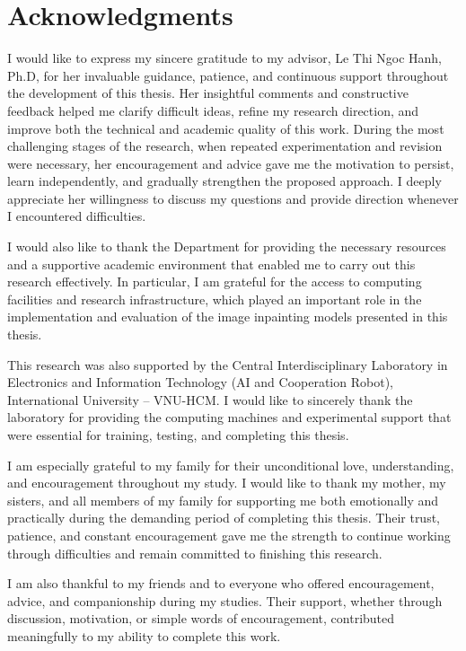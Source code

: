\documentclass[12pt, twoside]{report}
\begin{document}
\chapter*{Acknowledgments}
I would like to express my sincere gratitude to my advisor, Le Thi Ngoc Hanh, Ph.D, for her invaluable guidance, patience, and continuous support throughout the development of this thesis. Her insightful comments and constructive feedback helped me clarify difficult ideas, refine my research direction, and improve both the technical and academic quality of this work. During the most challenging stages of the research, when repeated experimentation and revision were necessary, her encouragement and advice gave me the motivation to persist, learn independently, and gradually strengthen the proposed approach. I deeply appreciate her willingness to discuss my questions and provide direction whenever I encountered difficulties.

I would also like to thank the Department for providing the necessary resources and a supportive academic environment that enabled me to carry out this research effectively. In particular, I am grateful for the access to computing facilities and research infrastructure, which played an important role in the implementation and evaluation of the image inpainting models presented in this thesis.

This research was also supported by the Central Interdisciplinary Laboratory in Electronics and Information Technology (AI and Cooperation Robot), International University -- VNU-HCM. I would like to sincerely thank the laboratory for providing the computing machines and experimental support that were essential for training, testing, and completing this thesis.

I am especially grateful to my family for their unconditional love, understanding, and encouragement throughout my study. I would like to thank my mother, my sisters, and all members of my family for supporting me both emotionally and practically during the demanding period of completing this thesis. Their trust, patience, and constant encouragement gave me the strength to continue working through difficulties and remain committed to finishing this research.

I am also thankful to my friends and to everyone who offered encouragement, advice, and companionship during my studies. Their support, whether through discussion, motivation, or simple words of encouragement, contributed meaningfully to my ability to complete this work.
\end{document}
